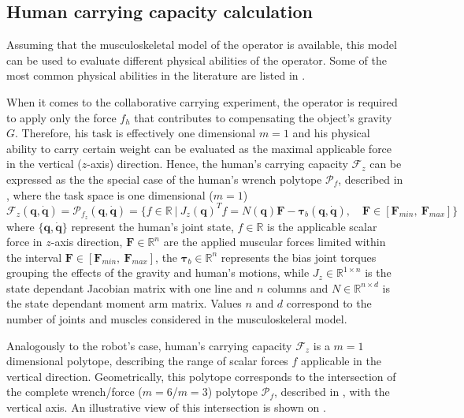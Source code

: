 \subsection{Human carrying capacity calculation}
\label{sec:human_carrying_capacity}

Assuming that the musculoskeletal model of the operator is available, this model can be used to evaluate different physical abilities of the operator. Some of the most common physical abilities in the literature are listed in . 

When it comes to the collaborative carrying experiment, the operator is required to apply only the force $f_{h}$ that contributes to compensating the object's gravity $G$. Therefore, his task is effectively one dimensional $m=1$ and his physical ability to carry certain weight can be evaluated as the maximal applicable force in the vertical ($z$-axis) direction. Hence, the human's carrying capacity $\mathcal{F}_z$ can be expressed as the the special case of the human's wrench polytope $\mathcal{P}_{f}$, described in  , where the task space is one dimensional ($m=1$)
\begin{equation}
     \mathcal{F}_z(\bm{q},\dot{\bm{q}}) = \mathcal{P}_{f_z} (\bm{q},\dot{\bm{q}}) = \{ f \in \mathbb{R} ~|~ J_{z}(\bm{q})^Tf=N(\bm{q})\bm{F} - \bm{\tau}_b(\bm{q},\dot{\bm{q}}), \quad \bm{F}\in[\bm{F}_{min}, ~\bm{F}_{max}]\}
\end{equation}
where $\{\bm{q},\dot{\bm{q}}\}$ represent the human's joint state, $f \in\mathbb{R}$ is the applicable scalar force in $z$-axis direction, $\bm{F}\in\mathbb{R}^n$ are the applied muscular forces limited within the interval $\bm{F}\in[\bm{F}_{min}, ~\bm{F}_{max}]$, the $\bm{\tau}_{b}\in\mathbb{R}^n$ represents the bias joint torques grouping the effects of the gravity and human's motions, while $J_{z}\in\mathbb{R}^{1\times n}$ is the state dependant Jacobian matrix with one line and $n$ columns and $N\in\mathbb{R}^{n\times d}$ is the state dependant moment arm matrix. Values $n$ and $d$ correspond to the number of joints and muscles considered in the musculoskeleral model.

Analogously to the robot's case, human's carrying capacity $\mathcal{F}_z$ is a $m=1$ dimensional polytope, describing the range of scalar forces $f$ applicable in the vertical direction. Geometrically, this polytope corresponds to the intersection of the complete wrench/force ($m=6$/$m=3$) polytope $\mathcal{P}_f$, described in , with the vertical axis. An illustrative view of this intersection is shown on .

